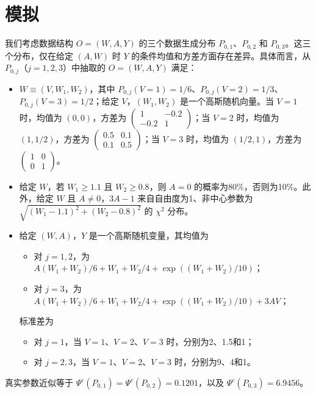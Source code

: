 \section{模拟}

我们考虑数据结构 $O=(W,A,Y)$ 的三个数据生成分布 $P_{0,1}$、$P_{0,2}$ 和 $P_{0,3}$。这三个分布，仅在给定 $(A,W)$ 时 $Y$ 的条件均值和方差方面存在差异。具体而言，从 $P_{0,j}$（$j=1,2,3$）中抽取的 $O=(W,A,Y)$ 满足：
\begin{itemize}
\item $W\equiv(V,W_1,W_2)$，其中 $P_{0,j}(V=1)=1/6$、$P_{0,j}(V=2)=1/3$、$P_{0,j}(V=3)=1/2$；给定 $V$，$(W_1,W_2)$ 是一个高斯随机向量。当 $V=1$ 时，均值为 $(0,0)$，方差为 $\left(\begin{smallmatrix}1&-0.2\\-0.2&1\end{smallmatrix}\right)$；当 $V=2$ 时，均值为 $(1,1/2)$，方差为 $\left(\begin{smallmatrix}0.5&0.1\\0.1&0.5\end{smallmatrix}\right)$；当 $V=3$ 时，均值为 $(1/2,1)$，方差为 $\left(\begin{smallmatrix}1&0\\0&1\end{smallmatrix}\right)$。
\item 给定 $W$，若 $W_1\ge1.1$ 且 $W_2\ge0.8$，则 $A=0$ 的概率为80\%，否则为10\%。此外，给定 $W$ 且 $A\ne0$，$3A-1$ 来自自由度为1、非中心参数为 $\sqrt{(W_1-1.1)^2+(W_2-0.8)^2}$ 的 $\chi^2$ 分布。
\item 给定 $(W,A)$，$Y$ 是一个高斯随机变量，其均值为
\begin{itemize}[label=--]
\item 对 $j=1,2$，为 $A(W_1+W_2)/6+W_1+W_2/4+\exp((W_1+W_2)/10)$；
\item 对 $j=3$，为 $A(W_1+W_2)/6+W_1+W_2/4+\exp((W_1+W_2)/10)+3AV$；
\end{itemize}
标准差为
\begin{itemize}[label=--]
\item 对 $j=1$，当 $V=1$、$V=2$、$V=3$ 时，分别为2、1.5和1；
\item 对 $j=2,3$，当 $V=1$、$V=2$、$V=3$ 时，分别为9、4和1。
\end{itemize}
\end{itemize}
真实参数近似等于 $\Psi^c(P_{0,1})=\Psi^c(P_{0,2})=0.1201$，以及 $\Psi^c(P_{0,3})=6.9456$。

